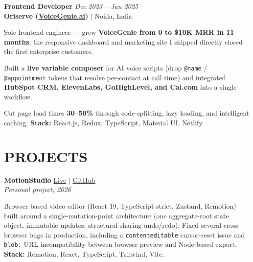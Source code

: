 \documentclass[a4paper,10pt]{article}
\begin{document}
\vspace{3pt}

\textbf{Frontend Developer} \hfill \textit{Dec 2023 -- Jan 2025}\\
\textbf{Oriserve (\href{https://voicegenie.ai/}{VoiceGenie.ai})} $|$ Noida, India

\vspace{2pt}
\begin{itemize}[leftmargin=0.15in, itemsep=1pt]
    \small{\item
    Sole frontend engineer --- grew \textbf{VoiceGenie from 0 to \$10K MRR in 11 months}; the responsive dashboard and marketing site I shipped directly closed the first enterprise customers.
    }

    \small{\item
    Built a \textbf{live variable composer} for AI voice scripts (drop \texttt{@name} / \texttt{@appointment} tokens that resolve per-contact at call time) and integrated \textbf{HubSpot CRM, ElevenLabs, GoHighLevel, and Cal.com} into a single workflow.
    }

    \small{\item
    Cut page load times \textbf{30--50\%} through code-splitting, lazy loading, and intelligent caching. \textbf{Stack:} React.js, Redux, TypeScript, Material UI, Netlify.
    }
\end{itemize}

\vspace{3pt}

\section{PROJECTS}

\textbf{MotionStudio} \hfill \href{https://motionstudio-six.vercel.app/}{Live} $|$ \href{https://github.com/BLAZE7SHADOW/MotionStudio}{GitHub}\\
\textit{Personal project, 2026}

\vspace{2pt}
\begin{itemize}[leftmargin=0.15in, itemsep=1pt]
    \small{\item
    Browser-based video editor (React 19, TypeScript strict, Zustand, Remotion) built around a single-mutation-point architecture (one aggregate-root state object, immutable updates, structural-sharing undo/redo). Fixed several cross-browser bugs in production, including a \texttt{contenteditable} cursor-reset issue and \texttt{blob:} URL incompatibility between browser preview and Node-based export. \textbf{Stack:} Remotion, React, TypeScript, Tailwind, Vite.
    }
\end{itemize}
\end{document}
